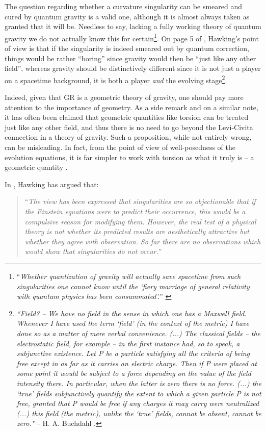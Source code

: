 \documentclass[12pt]{article}
\newcommand{\2}{$^2$}
\newcommand{\3}{$^3$}
\newcommand{\4}{$_4$}
\newcommand{\5}{$_5$}
\begin{document}
The question regarding whether a curvature singularity can be smeared and cured by quantum gravity is a valid one, although it is almost always taken as granted that it will be. Needless to say, lacking a fully working theory of quantum gravity we do not actually know this for certain\footnote{``\emph{Whether quantization of gravity will actually save spacetime from such singularities one cannot know until the `fiery marriage of general relativity with quantum physics has been consummated'.}'' \cite{MTW}}. 
On page 5 of \cite{HP}, Hawking's point of view is that if the singularity is indeed smeared out by quantum correction, things would be rather ``boring'' since gravity would then be ``just like any other field'', whereas gravity should be distinctively different since it is not just a player on a spacetime background, it is both a player \emph{and} the evolving stage\footnote{\emph{``Field? -- We have no field in the sense in which one has a Maxwell field. Whenever I have used the term `field' (in the context of the metric) I have done so as a matter of mere verbal convenience. (...) The classical fields -- the electrostatic field, for example -- in the first instance had, so to speak, a subjunctive existence. Let P be a particle satisfying all the criteria of being free except in as far as it carries an electric charge. Then if P were placed at some point it would be subject to a force depending on the value of the field intensity there. In particular, when the latter is zero there is no force. (...) the `true' fields subjunctively quantify the extent to which a given particle P is not free, granted that P would be free if any charges it may carry were neutralized (...) this field (the metric), unlike the `true' fields, cannot be absent, cannot be zero."} -- H. A. Buchdahl \cite{Buchdahl}.}. 

Indeed, given that GR is a geometric theory of gravity, one should pay more attention to the importance of geometry.  As a side remark and on a similar note, it has often been claimed that geometric quantities like torsion can be treated just like any other field, and thus there is no need to go beyond the Levi-Civita connection in a theory of gravity. Such a proposition, while not entirely wrong, can be misleading. In fact, from the point of view of well-posedness of the evolution equations, it is far simpler to work with torsion as what it truly is -- a geometric quantity \cite{nester}. 

In \cite{Hawking1966}, Hawking has argued that:
\begin{quote}
``\emph{The view has been expressed that singularities are so objectionable that if the Einstein equations were to predict their occurrence, this would be a compulsive reason for modifying them. However, the real test of a physical theory is not whether its predicted results are aesthetically attractive but whether they agree with observation. So far there are no observations which would show that singularities do not occur.}''
\end{quote}
\end{document}
